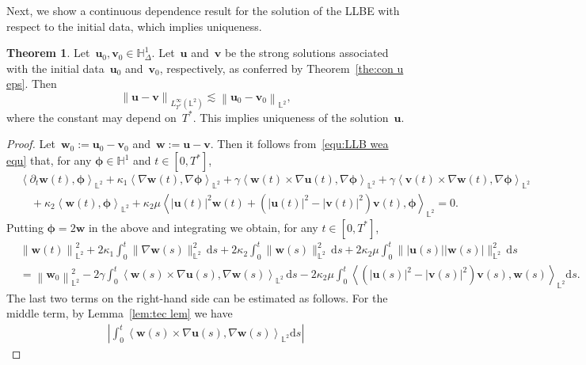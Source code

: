 \documentclass[11pt,reqno]{amsart}
\theoremstyle{definition}
\newtheorem{theorem}{Theorem}[section]
\numberwithin{equation}{section}
\newcommand{\bff}{\boldsymbol}
\newcommand{\bb}{\mathbb}
\newcommand{\ds}{\mathrm{d}s}
\newcommand{\norm}[2]{\left\|{#1}\right\|_{#2}}
\newcommand{\inpro}[2]{\left\langle#1,#2\right\rangle}
\begin{document}
Next, we show a continuous dependence result for the solution of the LLBE with respect to the initial data, which implies uniqueness.

\begin{theorem}\label{the:unique llb}
	Let~$\bff{u}_0, \bff{v}_0 \in \bb{H}^1_\Delta$.
	Let~$\bff{u}$ and~$\bff{v}$ be the strong solutions
	associated with the initial data~$\bff{u}_0$
	and~$\bff{v}_0$, respectively, as conferred by
	Theorem~\ref{the:con u eps}. Then
	\[
	\norm{\bff{u}-\bff{v}}{L^\infty_{T^\ast}(\bb{L}^2)} 
	\lesssim
	\norm{\bff{u}_0-\bff{v}_0}{\bb{L}^2}, 
	\]
	where the constant may depend on~$T^\ast$. This implies
	uniqueness of the solution~$\bff{u}$.
\end{theorem}

\begin{proof}
	Let~$\bff{w}_0:=\bff{u}_0-\bff{v}_0$ 
	and~$\bff{w}:=\bff{u}-\bff{v}$.
	Then it follows from~\eqref{equ:LLB wea equ} that, for any $\bff{\phi}\in
	\bb{H}^1$ and $t\in [0,T^\ast]$,
	\begin{align*}
		&\inpro{\partial_t \bff{w}(t)}{\bff{\phi}}_{\bb{L}^2}
		+
		\kappa_1 \inpro{\nabla\bff{w}(t)}{\nabla\bff{\phi}}_{\bb{L}^2}
		+
		\gamma \inpro{\bff{w}(t)\times\nabla\bff{u}(t)}{\nabla\bff{\phi}}_{\bb{L}^2}
		+
		\gamma \inpro{\bff{v}(t)\times\nabla\bff{w}(t)}{\nabla\bff{\phi}}_{\bb{L}^2}
		\\
		&\quad
		+
		\kappa_2 \inpro{\bff{w}(t)}{\bff{\phi}}_{\bb{L}^2}
		+
		\kappa_2\mu \inpro{|\bff{u}(t)|^2\bff{w}(t) + (|\bff{u}(t)|^2-|\bff{v}(t)|^2)\bff{v}(t)}{\bff{\phi}}_{\bb{L}^2}
		= 
		0.
	\end{align*}
	Putting $\bff{\phi} = 2\bff{w}$ in the above 
	and
	integrating we obtain, for any $t\in [0,T^\ast]$,
	\begin{align*}
		&\norm{\bff{w}(t)}{\bb{L}^2}^2
		+
		2\kappa_1\int_0^t \|\nabla\bff{w}(s)\|^2_{\bb{L}^2}\,\ds
		+
		2\kappa_2\int_0^t \|\bff{w}(s)\|^2_{\bb{L}^2}\,\ds
		+
		2\kappa_2\mu\int_0^t\||\bff{u}(s)|
		|\bff{w}(s)|\|^2_{\bb{L}^2}\,\ds
		\\
		&=
		\norm{\bff{w}_0}{\bb{L}^2}^2
		-
		2 \gamma
		\int_0^t 
		\inpro{\bff{w}(s)\times\nabla\bff{u}(s)}
		{\nabla\bff{w}(s)}_{\bb{L}^2}\,\ds
		-
		2 \kappa_2\mu
		\int_0^t 
		\inpro{(|\bff{u}(s)|^2-|\bff{v}(s)|^2)\bff{v}(s)}
		{\bff{w}(s)}_{\bb{L}^2} \ds.
	\end{align*}
	The last two terms on the right-hand side can be estimated as
	follows. For the middle term, by Lemma~\ref{lem:tec lem} we have
	\begin{align*}
		\left| \int_0^t \inpro{\bff{w}(s)\times\nabla\bff{u}(s)}{\nabla\bff{w}(s)}_{\bb{L}^2}\ds \right| 

\end{align*}
\end{proof}
\end{document}
